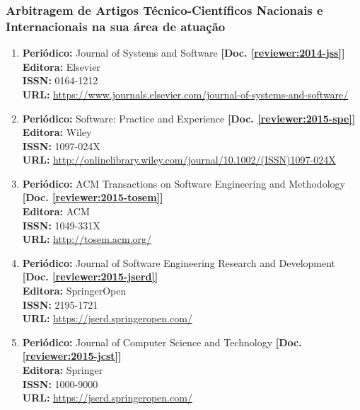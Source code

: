 \documentclass[a4paper,oneside,10pt]{article}
\begin{document}
\subsubsection{Arbitragem de Artigos Técnico-Científicos Nacionais e Internacionais na sua área de atuação}
\vspace{0.3cm}

\begin{enumerate}
\renewcommand{\labelenumi}{{\large\bfseries\arabic{enumi}.}}

\item   \textbf{Peri\'{o}dico:} Journal of Systems and Software \textbf{[Doc. \ref{reviewer:2014-jss}]}\\
        \textbf{Editora:} Elsevier\\
        \textbf{ISSN:} 0164-1212\\
        \textbf{URL:} \url{https://www.journals.elsevier.com/journal-of-systems-and-software/}

\item   \textbf{Peri\'{o}dico:} Software: Practice and Experience \textbf{[Doc. \ref{reviewer:2015-spe}]}\\
        \textbf{Editora:} Wiley\\
        \textbf{ISSN:} 1097-024X\\
        \textbf{URL:} \url{http://onlinelibrary.wiley.com/journal/10.1002/(ISSN)1097-024X}

\item   \textbf{Peri\'{o}dico:} ACM Transactions on Software Engineering and Methodology \textbf{[Doc. \ref{reviewer:2015-tosem}]}\\
        \textbf{Editora:} ACM\\
        \textbf{ISSN:} 1049-331X\\
        \textbf{URL:} \url{http://tosem.acm.org/}

\item   \textbf{Peri\'{o}dico:} Journal of Software Engineering Research and Development \textbf{[Doc. \ref{reviewer:2015-jserd}]}\\
        \textbf{Editora:} SpringerOpen\\
        \textbf{ISSN:} 2195-1721\\
        \textbf{URL:} \url{https://jserd.springeropen.com/}

\item   \textbf{Peri\'{o}dico:} Journal of Computer Science and Technology \textbf{[Doc. \ref{reviewer:2015-jcst}]}\\
        \textbf{Editora:} Springer\\
        \textbf{ISSN:} 1000-9000\\
        \textbf{URL:} \url{https://jserd.springeropen.com/}


\end{enumerate}
\end{document}
